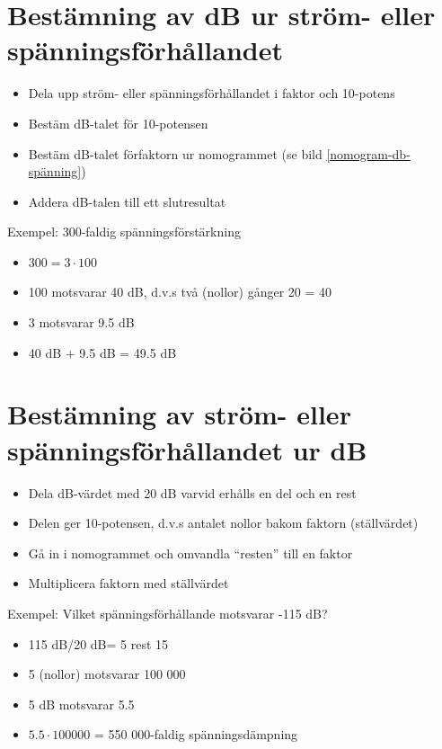 \begin{rev-raderas}

\section{Bestämning av dB ur ström- eller spänningsförhållandet}

\begin{itemize}
\item Dela upp ström- eller spänningsförhållandet i faktor och 10-potens
\item Bestäm dB-talet för 10-potensen
\item Bestäm dB-talet förfaktorn ur nomogrammet (se bild \ref{nomogram-db-spänning})
\item Addera dB-talen till ett slutresultat
\end{itemize}

Exempel: 300-faldig spänningsförstärkning
\begin{itemize}
\item \(300 = 3 \cdot 100\)
\item 100 motsvarar 40 dB, d.v.s två (nollor) gånger 20 = 40
\item 3 motsvarar 9.5 dB
\item 40 dB + 9.5 dB = 49.5 dB
\end{itemize}

\section{Bestämning av ström- eller spänningsförhållandet ur dB}
\begin{itemize}
\item Dela dB-värdet med 20 dB varvid erhålls en del och en rest
\item Delen ger 10-potensen, d.v.s antalet nollor bakom faktorn
  (ställvärdet)
\item Gå in i nomogrammet och omvandla ``resten'' till en faktor
\item Multiplicera faktorn med ställvärdet
\end{itemize}

Exempel: Vilket spänningsförhållande motsvarar -115 dB?
\begin{itemize}
\item 115 dB/20 dB= 5 rest 15
\item 5 (nollor) motsvarar 100 000
\item 5 dB motsvarar 5.5
\item \(5.5 \cdot 1 00 000\) = 550 000-faldig spänningsdämpning
\end{itemize}

\end{rev-raderas}


